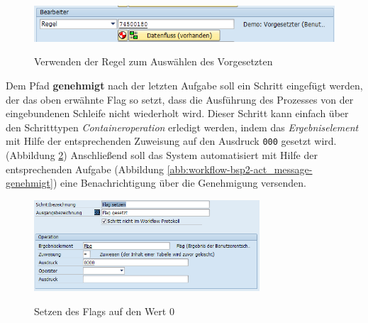 \begin{figure}[h]
	\begin{center}
	\includegraphics[width=1.0\textwidth]{grafiken/wf-builder_bsp2_act_am-genehmigen_klein.png}
	\caption{Verwenden der Regel zum Auswählen des Vorgesetzten}
	\vspace{-10pt}
	\label{abb:workflow-bsp2-act_am-genehmigen_klein}
	\end{center}
\end{figure}

Dem Pfad \textbf{genehmigt} nach der letzten Aufgabe soll ein Schritt eingefügt werden, der das oben erwähnte Flag so setzt, dass die Ausführung des Prozesses von der eingebundenen Schleife nicht wiederholt wird. Dieser Schritt kann einfach über den Schritttypen \textit{Containeroperation} erledigt werden, indem das \textit{Ergebniselement} mit Hilfe der entsprechenden Zuweisung auf den Ausdruck \texttt{000} gesetzt wird. (Abbildung \ref{abb:workflow-bsp2-act_flag-0000}) Anschließend soll das System automatisiert mit Hilfe der entsprechenden Aufgabe (Abbildung \ref{abb:workflow-bsp2-act_message-genehmigt}) eine Benachrichtigung über die Genehmigung versenden.

\begin{figure}[h]
	\begin{center}
	\includegraphics[width=0.75\textwidth]{grafiken/wf-builder_bsp2_act_flag_0000.png}
	\caption{Setzen des Flags auf den Wert 0}
	\vspace{-10pt}
	\label{abb:workflow-bsp2-act_flag-0000}
	\end{center}
\end{figure}

